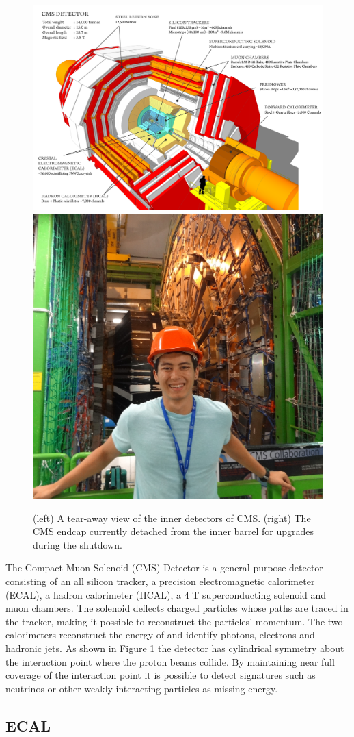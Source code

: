 \begin{figure}
\begin{center}
\includegraphics[width=.55\textwidth]{figures/pre_thesis/cms.png}
\hspace{.1in}
\includegraphics[width=.4\textwidth]{figures/pre_thesis/selfie}
\end{center}
\caption{(left) A tear-away view of the inner detectors of CMS. (right) The CMS endcap currently detached from the inner barrel for upgrades during the shutdown.}
\label{fig:cms}
\end{figure}

The Compact Muon Solenoid (CMS) Detector is a general-purpose detector consisting of 
an all silicon tracker, a precision electromagnetic calorimeter (ECAL), a hadron calorimeter
 (HCAL), a 4 T superconducting solenoid and muon chambers. The solenoid deflects charged
 particles whose paths are traced in the tracker, making it possible to 
reconstruct the particles’ momentum. The two calorimeters reconstruct the energy 
of and identify photons, electrons and hadronic jets.
As shown in Figure \ref{fig:cms} the detector has cylindrical symmetry about the
 interaction point where the proton beams collide. By maintaining near full coverage 
of the interaction point it is possible to detect signatures such as neutrinos or other weakly interacting particles as missing energy. 


\subsection{ECAL}

